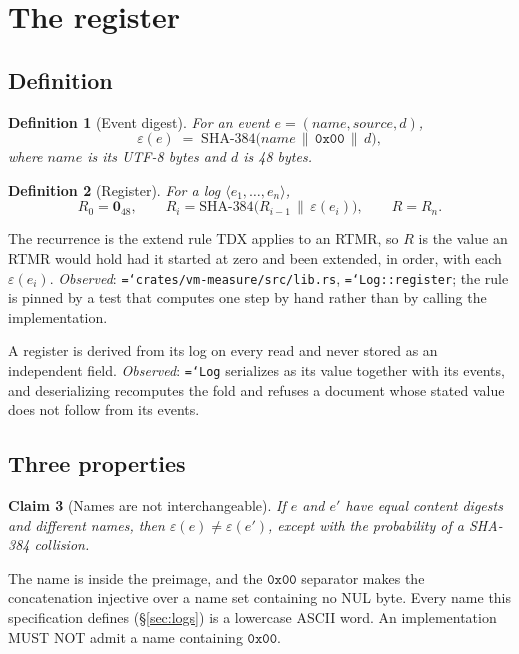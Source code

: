 \documentclass[11pt,a4paper]{article}
\newtheorem{definition}{Definition}[section]
\newtheorem{claim}[definition]{Claim}
\newcommand{\code}[1]{\texttt{\hyphenchar\font=`\-\relax #1}}
\newcommand{\sha}[1]{\mathrm{SHA\text{-}#1}}
\newcommand{\zero}{\mathbf{0}}
\begin{document}
\section{The register}
\label{sec:register}

\subsection{Definition}

\begin{definition}[Event digest]
For an event $e = (\mathit{name}, \mathit{source}, d)$,
\[
  \varepsilon(e) \;=\; \sha{384}\bigl(\mathit{name} \,\|\, \mathtt{0x00} \,\|\, d\bigr),
\]
where $\mathit{name}$ is its UTF-8 bytes and $d$ is 48 bytes.
\end{definition}

\begin{definition}[Register]
For a log $\langle e_1, \dots, e_n \rangle$,
\[
  R_0 = \zero_{48}, \qquad
  R_i = \sha{384}\bigl(R_{i-1} \,\|\, \varepsilon(e_i)\bigr), \qquad
  R = R_n .
\]
\end{definition}

The recurrence is the extend rule TDX applies to an RTMR, so $R$ is the value an
RTMR would hold had it started at zero and been extended, in order, with each
$\varepsilon(e_i)$. \emph{Observed}: \code{crates/vm-measure/src/lib.rs},
\code{Log::register}; the rule is pinned by a test that computes one step by hand
rather than by calling the implementation.

A register is derived from its log on every read and never stored as an
independent field. \emph{Observed}: \code{Log} serializes as its value together
with its events, and deserializing recomputes the fold and refuses a document
whose stated value does not follow from its events.

\subsection{Three properties}

\begin{claim}[Names are not interchangeable]
\label{cl:name}
If $e$ and $e'$ have equal content digests and different names, then
$\varepsilon(e) \ne \varepsilon(e')$, except with the probability of a SHA-384
collision.
\end{claim}
\noindent The name is inside the preimage, and the $\mathtt{0x00}$ separator makes
the concatenation injective over a name set containing no NUL byte. Every name
this specification defines (\S\ref{sec:logs}) is a lowercase ASCII word. An
implementation MUST NOT admit a name containing $\mathtt{0x00}$.
\end{document}
